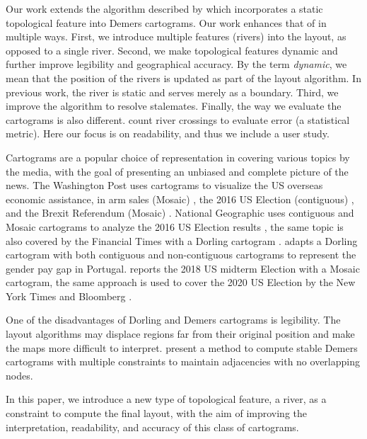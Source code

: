 Our work extends the algorithm described by \citet{tong2018Cartograms} which incorporates a static topological feature into Demers cartograms. Our work enhances that of \citet{tong2018Cartograms} in multiple ways. First, we introduce multiple features (rivers) into the layout, as opposed to a single river. Second, we make topological features dynamic and further improve legibility and geographical accuracy. By the term \textit{dynamic}, we mean that the position of the rivers is updated as part of the layout algorithm. In previous work, the river is static and serves merely as a boundary. Third, we improve the algorithm to resolve stalemates. Finally, the way we evaluate the cartograms is also different. \citet{tong2018Cartograms} count river crossings to evaluate error (a statistical metric). Here our focus is on readability, and thus we include a user study.

Cartograms are a popular choice of representation in covering various topics by the media, with the goal of presenting an unbiased and complete picture of the news. The Washington Post uses cartograms to visualize the US overseas economic assistance, in arm sales (Mosaic) \cite{bearak2016Everything}, the 2016 US Election (contiguous) \cite{gamio2016Election}, and the Brexit Referendum (Mosaic) \cite{taylor2016What}. National Geographic uses contiguous and Mosaic cartograms to analyze the 2016 US Election results \cite{miller2016Election}, the same topic is also covered by the Financial Times with a Dorling cartogram \cite{stabe2016Search}. \citet{cruz2017Adapted} adapts a Dorling cartogram with both contiguous and non-contiguous cartograms to represent the gender pay gap in Portugal. \citet{sandberg2018Cartogram} reports the 2018 US midterm Election with a Mosaic cartogram, the same approach is used to cover the 2020 US Election by the New York Times \cite{thelearningnetwork2020What} and Bloomberg \cite{mccartney20202020}.

One of the disadvantages of Dorling and Demers cartograms is legibility. The layout algorithms may displace regions far from their original position and make the maps more difficult to interpret. \citet{nickel2022Multicriteria} present a method to compute stable Demers cartograms with multiple constraints to maintain adjacencies with no overlapping nodes.

In this paper, we introduce a new type of topological feature, a river, as a constraint to compute the final layout, with the aim of improving the interpretation, readability, and accuracy of this class of cartograms.